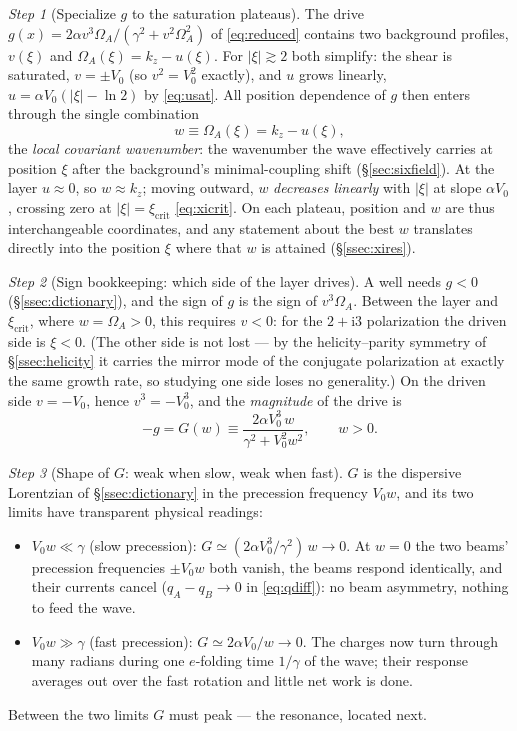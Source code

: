 \documentclass[11pt,a4paper]{article}
\numberwithin{equation}{section}
\theoremstyle{remark}
\newtheorem{step}{Step}[subsection]
\newcommand{\Vo}{V_0}
\newcommand{\kz}{k_z}
\newcommand{\OmA}{\Omega_A}
\newcommand{\ii}{\mathrm{i}}
\begin{document}
\begin{step}[Specialize $g$ to the saturation plateaus]
The drive $g(x)=2\alpha v^3\OmA/(\gamma^2+v^2\OmA^2)$ of
\eqref{eq:reduced} contains two background profiles, $v(\xi)$ and
$\OmA(\xi)=\kz-u(\xi)$. For $|\xi|\gtrsim2$ both simplify: the shear is
saturated, $v=\pm\Vo$ (so $v^2=\Vo^2$ exactly), and $u$ grows linearly,
$u=\alpha\Vo(|\xi|-\ln2)$ by \eqref{eq:usat}. All position dependence of
$g$ then enters through the single combination
\begin{equation}
w\equiv\OmA(\xi)=\kz-u(\xi),
\label{eq:wdef}
\end{equation}
the \emph{local covariant wavenumber}: the wavenumber the wave
effectively carries at position $\xi$ after the background's
minimal-coupling shift (\S\ref{sec:sixfield}). At the layer $u\approx0$,
so $w\approx\kz$; moving outward, $w$ \emph{decreases linearly} with
$|\xi|$ at slope $\alpha\Vo$, crossing zero at
$|\xi|=\xi_{\mathrm{crit}}$ \eqref{eq:xicrit}. On each plateau, position
and $w$ are thus interchangeable coordinates, and any statement about
the best $w$ translates directly into the position $\xi$ where that $w$
is attained (\S\ref{ssec:xires}).
\end{step}

\begin{step}[Sign bookkeeping: which side of the layer drives]
A well needs $g<0$ (\S\ref{ssec:dictionary}), and the sign of $g$ is the
sign of $v^3\OmA$. Between the layer and $\xi_{\mathrm{crit}}$, where
$w=\OmA>0$, this requires $v<0$: for the $2+\ii3$ polarization the
driven side is $\xi<0$. (The other side is not lost --- by the
helicity--parity symmetry of \S\ref{ssec:helicity} it carries the mirror
mode of the conjugate polarization at exactly the same growth rate, so
studying one side loses no generality.) On the driven side $v=-\Vo$,
hence $v^3=-\Vo^3$, and the \emph{magnitude} of the drive is
\begin{equation}
-g=G(w)\equiv\frac{2\alpha \Vo^3\,w}{\gamma^2+\Vo^2w^2},
\qquad w>0 .
\label{eq:Gdef}
\end{equation}
\end{step}

\begin{step}[Shape of $G$: weak when slow, weak when fast]
$G$ is the dispersive Lorentzian of \S\ref{ssec:dictionary} in the
precession frequency $\Vo w$, and its two limits have transparent
physical readings:
\begin{itemize}
\item $\Vo w\ll\gamma$ (slow precession):
$G\simeq(2\alpha\Vo^3/\gamma^2)\,w\to0$. At $w=0$ the two beams'
precession frequencies $\pm\Vo w$ both vanish, the beams respond
identically, and their currents cancel ($q_A-q_B\to0$ in
\eqref{eq:qdiff}): no beam asymmetry, nothing to feed the wave.
\item $\Vo w\gg\gamma$ (fast precession): $G\simeq2\alpha\Vo/w\to0$. The
charges now turn through many radians during one $e$-folding time
$1/\gamma$ of the wave; their response averages out over the fast
rotation and little net work is done.
\end{itemize}
Between the two limits $G$ must peak --- the resonance, located next.
\end{step}
\end{document}
